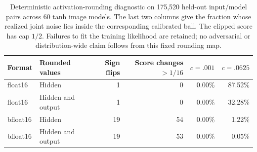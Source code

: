 \begin{table}[t]
\centering\small
\begin{tabular}{llrrrr}
\toprule
Format & Rounded values & Sign flips & Score changes $>1/16$ & $c=.001$ & $c=.0625$ \\
\midrule
float16 & Hidden & 1 & 0 & 0.00\% & 87.52\% \\
float16 & Hidden and output & 1 & 0 & 0.00\% & 32.28\% \\
bfloat16 & Hidden & 19 & 54 & 0.00\% & 1.22\% \\
bfloat16 & Hidden and output & 19 & 53 & 0.00\% & 0.05\% \\
\bottomrule
\end{tabular}
\caption{Deterministic activation-rounding diagnostic on 175,520 held-out input/model pairs across 60 tanh image models. The last two columns give the fraction whose realized joint noise lies inside the corresponding calibrated ball. The clipped score has cap $1/2$. Failures to fit the training likelihood are retained; no adversarial or distribution-wide claim follows from this fixed rounding map.}
\label{tab:quantization}
\end{table}
